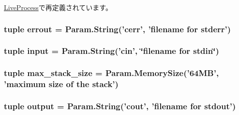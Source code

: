 \hyperlink{classProcess_1_1LiveProcess_a17da7064bc5c518791f0c891eff05fda}{LiveProcess}で再定義されています。\hypertarget{classProcess_1_1Process_a5de99c4e0673c09518ff846607e63cbb}{
\subsubsection[{errout}]{\setlength{\rightskip}{0pt plus 5cm}tuple {\bf errout} = Param.String('cerr', 'filename for stderr')}}
\label{classProcess_1_1Process_a5de99c4e0673c09518ff846607e63cbb}
\hypertarget{classProcess_1_1Process_a87f26bd4366753f69c0fdbf3c87080c9}{
\subsubsection[{input}]{\setlength{\rightskip}{0pt plus 5cm}tuple {\bf input} = Param.String('cin', \char`\"{}filename for stdin\char`\"{})}}
\label{classProcess_1_1Process_a87f26bd4366753f69c0fdbf3c87080c9}
\hypertarget{classProcess_1_1Process_a33b435349032a80699ab37d8b10ff10b}{
\subsubsection[{max\_\-stack\_\-size}]{\setlength{\rightskip}{0pt plus 5cm}tuple {\bf max\_\-stack\_\-size} = Param.MemorySize('64MB', 'maximum size of the stack')}}
\label{classProcess_1_1Process_a33b435349032a80699ab37d8b10ff10b}
\hypertarget{classProcess_1_1Process_acf316e258896197f4e917a6547e49532}{
\subsubsection[{output}]{\setlength{\rightskip}{0pt plus 5cm}tuple {\bf output} = Param.String('cout', 'filename for stdout')}}
